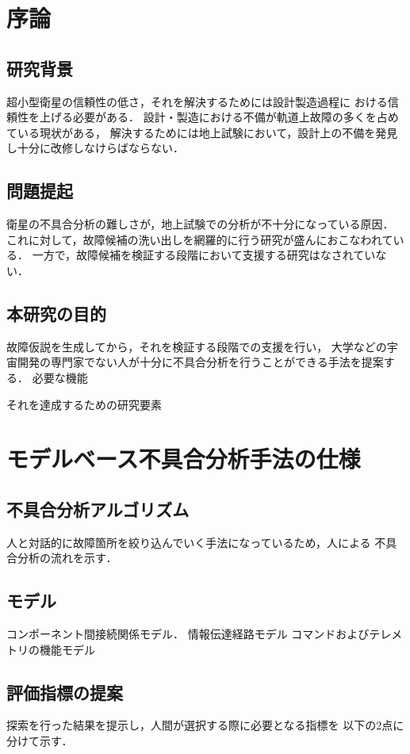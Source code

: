 \documentclass[11pt]{jsarticle}%
\begin{document}
\begin{multicols}{2}
  \section{序論}

  \subsection{研究背景}
  超小型衛星の信頼性の低さ，それを解決するためには設計製造過程に
  おける信頼性を上げる必要がある．
  設計・製造における不備が軌道上故障の多くを占めている現状がある，
  解決するためには地上試験において，設計上の不備を発見し十分に改修しなけらばならない．

  
  \subsection{問題提起}
  衛星の不具合分析の難しさが，地上試験での分析が不十分になっている原因．
  これに対して，故障候補の洗い出しを網羅的に行う研究が盛んにおこなわれている．
  一方で，故障候補を検証する段階において支援する研究はなされていない．

  \subsection{本研究の目的}
  故障仮説を生成してから，それを検証する段階での支援を行い，
  大学などの宇宙開発の専門家でない人が十分に不具合分析を行うことができる手法を提案する．
  必要な機能

  それを達成するための研究要素

  \section{モデルベース不具合分析手法の仕様}
  \subsection{不具合分析アルゴリズム}
  人と対話的に故障箇所を絞り込んでいく手法になっているため，人による
  不具合分析の流れを示す．


  \subsection{モデル}
  コンポーネント間接続関係モデル．
  情報伝達経路モデル
  コマンドおよびテレメトリの機能モデル%

  \subsection{評価指標の提案}
  探索を行った結果を提示し，人間が選択する際に必要となる指標を
  以下の2点に分けて示す．


\end{multicols}
\end{document}
